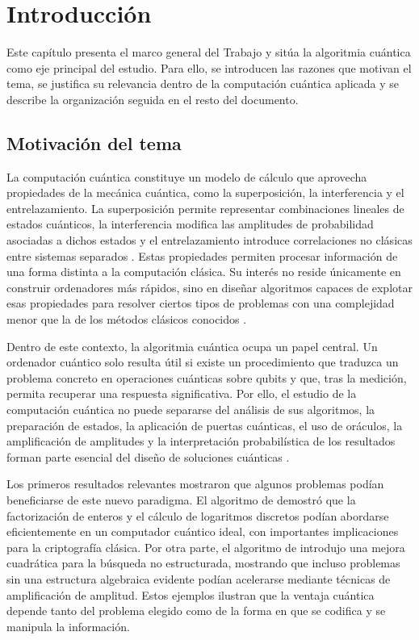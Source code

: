 \chapter{Introducción}

Este capítulo presenta el marco general del Trabajo y sitúa la algoritmia cuántica como eje principal del estudio. Para ello, se introducen las razones que motivan el tema, se justifica su relevancia dentro de la computación cuántica aplicada y se describe la organización seguida en el resto del documento.

\section{Motivación del tema}

La computación cuántica constituye un modelo de cálculo que aprovecha propiedades de la mecánica cuántica, como la superposición, la interferencia y el entrelazamiento. La superposición permite representar combinaciones lineales de estados cuánticos, la interferencia modifica las amplitudes de probabilidad asociadas a dichos estados y el entrelazamiento introduce correlaciones no clásicas entre sistemas separados \citep{dirac1930,bell1964}. Estas propiedades permiten procesar información de una forma distinta a la computación clásica. Su interés no reside únicamente en construir ordenadores más rápidos, sino en diseñar algoritmos capaces de explotar esas propiedades para resolver ciertos tipos de problemas con una complejidad menor que la de los métodos clásicos conocidos \citep{nielsen2010}.

Dentro de este contexto, la algoritmia cuántica ocupa un papel central. Un ordenador cuántico solo resulta útil si existe un procedimiento que traduzca un problema concreto en operaciones cuánticas sobre qubits y que, tras la medición, permita recuperar una respuesta significativa. Por ello, el estudio de la computación cuántica no puede separarse del análisis de sus algoritmos, la preparación de estados, la aplicación de puertas cuánticas, el uso de oráculos, la amplificación de amplitudes y la interpretación probabilística de los resultados forman parte esencial del diseño de soluciones cuánticas \citep{nielsen2010}.

Los primeros resultados relevantes mostraron que algunos problemas podían beneficiarse de este nuevo paradigma. El algoritmo de \cite{shor1994} demostró que la factorización de enteros y el cálculo de logaritmos discretos podían abordarse eficientemente en un computador cuántico ideal, con importantes implicaciones para la criptografía clásica. Por otra parte, el algoritmo de \cite{grover1996} introdujo una mejora cuadrática para la búsqueda no estructurada, mostrando que incluso problemas sin una estructura algebraica evidente podían acelerarse mediante técnicas de amplificación de amplitud. Estos ejemplos ilustran que la ventaja cuántica depende tanto del problema elegido como de la forma en que se codifica y se manipula la información.

